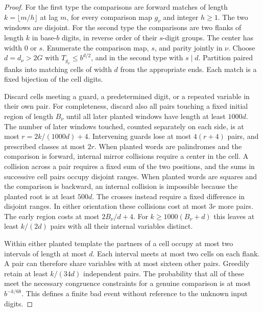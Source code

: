 \begin{proof}
For the first type the comparisons are forward matches of length $k=\lfloor m/h\rfloor$ at lag $m$, for every comparison map $g_\nu$ and integer $h\ge1$. The two windows are disjoint. For the second type the comparisons are two flanks of length $k$ in base-$b$ digits, in reverse order of their $s$-digit groups. The center has width $0$ or $s$. Enumerate the comparison map, $s$, and parity jointly in $\nu$. Choose $d=d_\nu>2G$ with $T_{g_\nu}\le b^{d/2}$, and in the second type with $s\mid d$. Partition paired flanks into matching cells of width $d$ from the appropriate ends. Each match is a fixed bijection of the cell digits.

Discard cells meeting a guard, a predetermined digit, or a repeated variable in their own pair. For completeness, discard also all pairs touching a fixed initial region of length $B_\nu$ until all later planted windows have length at least $1000d$. The number of later windows touched, counted separately on each side, is at most $r=2k/(1000d)+4$. Intervening guards lose at most $4(r+4)$ pairs, and prescribed classes at most $2r$. When planted words are palindromes and the comparison is forward, internal mirror collisions require a center in the cell. A collision across a pair requires a fixed sum of the two positions, and the sums in successive cell pairs occupy disjoint ranges. When planted words are squares and the comparison is backward, an internal collision is impossible because the planted root is at least $500d$. The crosses instead require a fixed difference in disjoint ranges. In either orientation these collisions cost at most $3r$ more pairs. The early region costs at most $2B_\nu/d+4$. For $k\ge1000(B_\nu+d)$ this leaves at least $k/(2d)$ pairs with all their internal variables distinct.

Within either planted template the partners of a cell occupy at most two intervals of length at most $d$. Each interval meets at most two cells on each flank. A pair can therefore share variables with at most sixteen other pairs. Greedily retain at least $k/(34d)$ independent pairs. The probability that all of these meet the necessary congruence constraints for a genuine comparison is at most $b^{-k/68}$. This defines a finite bad event without reference to the unknown input digits.


\end{proof}
